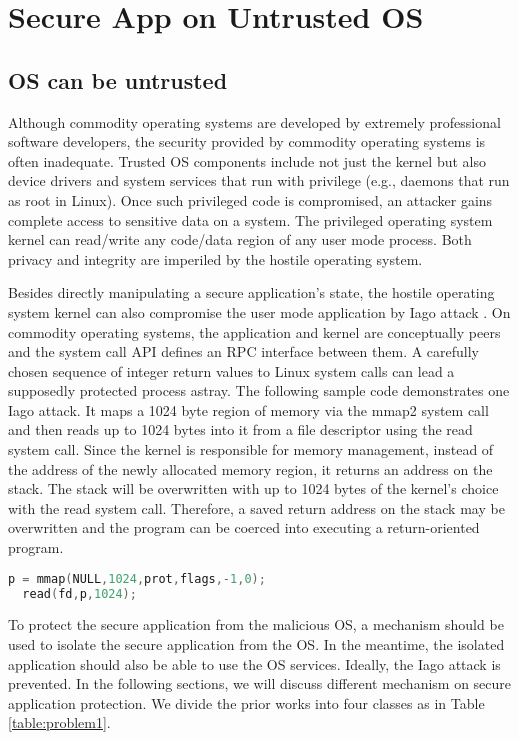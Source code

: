 \section{Secure App on Untrusted OS}
\label{sec:problem1}

\subsection{OS can be untrusted}

Although commodity operating systems are developed by extremely professional
software developers, the security provided by commodity operating systems is
often inadequate. Trusted OS components include not just the kernel but also
device drivers and system services that run with privilege (e.g., daemons that
run as root in Linux). Once such privileged code is compromised, an attacker
gains complete access to sensitive data on a system. The privileged operating
system kernel can read/write any code/data region of any user mode process.
Both privacy and integrity are imperiled by the hostile operating system.

Besides directly manipulating a secure application's state, the hostile
operating system kernel can also compromise the user mode application by Iago
attack \cite{Iago}. On commodity operating systems, the application and kernel
are conceptually peers and the system call API defines an RPC interface between
them. A carefully chosen sequence of integer return values to Linux system
calls can lead a supposedly protected process astray. The following sample code
demonstrates one Iago attack. It maps a 1024 byte region of memory via the
mmap2 system call and then reads up to 1024 bytes into it from a file
descriptor using the read system call. Since the kernel is responsible for
memory management, instead of the address of the newly allocated memory region,
it returns an address on the stack.  The stack will be overwritten with up to
1024 bytes of the kernel's choice with the read system call. Therefore, a saved
return address on the stack may be overwritten and the program can be coerced
into executing a return-oriented program.

\begin{lstlisting}[language=C]
  p = mmap(NULL,1024,prot,flags,-1,0);
  read(fd,p,1024);
\end{lstlisting}

To protect the secure application from the malicious OS, a mechanism should be
used to isolate the secure application from the OS. In the meantime, the
isolated application should also be able to use the OS services. Ideally, the
Iago attack is prevented. In the following sections, we will discuss different
mechanism on secure application protection. We divide the prior works into four
classes as in Table \ref{table:problem1}.

